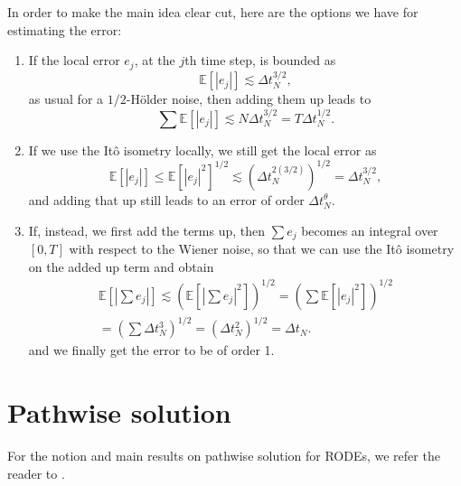 \documentclass[reqno,12pt]{amsart}
\theoremstyle{plain}%
\theoremstyle{definition}
\begin{document}
In order to make the main idea clear cut, here are the options we have for estimating the error:
\begin{enumerate}
  \item If the local error $e_j$, at the $j$th time step, is bounded as
    $$
    \mathbb{E}[|e_j|] \lesssim \Delta t_N^{3/2},
    $$
    as usual for a $1/2$-H\"older noise, then adding them up leads to 
    $$
      \sum \mathbb{E}[|e_j|] \lesssim N\Delta t_N^{3/2} = T\Delta t_N^{1/2}.
    $$
    \item If we use the It\^o isometry locally, we still get the local error as
    $$
      \mathbb{E}[|e_j|] \leq \mathbb{E}[|e_j|^2]^{1/2} \lesssim \left(\Delta t_N^{2(3/2)} \right)^{1/2} = \Delta t_N^{3/2},
    $$
    and adding that up still leads to an error of order $\Delta t_N^{\theta}$.
    \item If, instead, we first add the terms up, then $\sum e_j$ becomes an integral over $[0, T]$ with respect to the Wiener noise, so that we can use the It\^o isometry on the added up term and obtain
    \begin{multline*}
      \mathbb{E}\left[ \left| \sum e_j \right| \right] \lesssim \left(\mathbb{E}\left[ \left| \sum e_j \right|^2 \right]\right)^{1/2} = \left( \sum \mathbb{E}[|e_j|^2] \right)^{1/2} \\
      = \left( \sum \Delta t_N^3 \right)^{1/2} = \left( \Delta t_N^2 \right)^{1/2} = \Delta t_N.
    \end{multline*}
    and we finally get the error to be of order 1.
\end{enumerate}

\section{Pathwise solution}
\label{secpathwisesolution}

For the notion and main results on pathwise solution for RODEs, we refer the reader to \cite[Section 2.1]{HanKloeden2017}.
\end{document}
